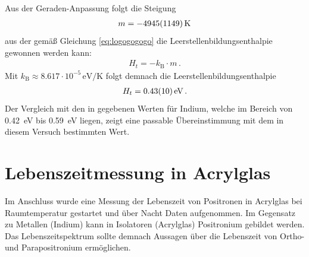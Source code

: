 \documentclass[11pt, a4paper]{article}
\numberwithin{equation}{section}
\begin{document}
Aus der Geraden-Anpassung folgt die Steigung
\begin{align*}
	m = \SI{-4945 +- 1149}{\kelvin}
\end{align*}
aus der gemäß Gleichung \eqref{eq:logogogogo} die Leerstellenbildungsenthalpie gewonnen werden kann:
\begin{align*}
	H_t = -k_\mathrm{B} \cdot m \, \text{.}
\end{align*}
Mit $k_\mathrm{B} \approx \num{8.617} \cdot 10^{-5} \, \si{\eV\per\kelvin}$ \cite{codata} folgt demnach die Leerstellenbildungsenthalpie
\begin{align*}
	H_t = \SI{0.43 +- 0.10}{\electronvolt} \, \text{.}
\end{align*}
Der Vergleich mit den in \cite{indium} gegebenen Werten für Indium, welche im Bereich von \SI{0.42}{\eV} bis \SI{0.59}{\eV} liegen, zeigt eine passable Übereinstimmung mit dem in diesem Versuch bestimmten Wert.


\section{Lebenszeitmessung in Acrylglas}
Im Anschluss wurde eine Messung der Lebenszeit von Positronen in Acrylglas bei Raumtemperatur gestartet und über Nacht Daten aufgenommen.
Im Gegensatz zu Metallen (Indium) kann in Isolatoren (Acrylglas) Positronium gebildet werden.
Das Lebenszeitspektrum sollte demnach Aussagen über die Lebenszeit von Ortho- und Parapositronium ermöglichen.
\end{document}
